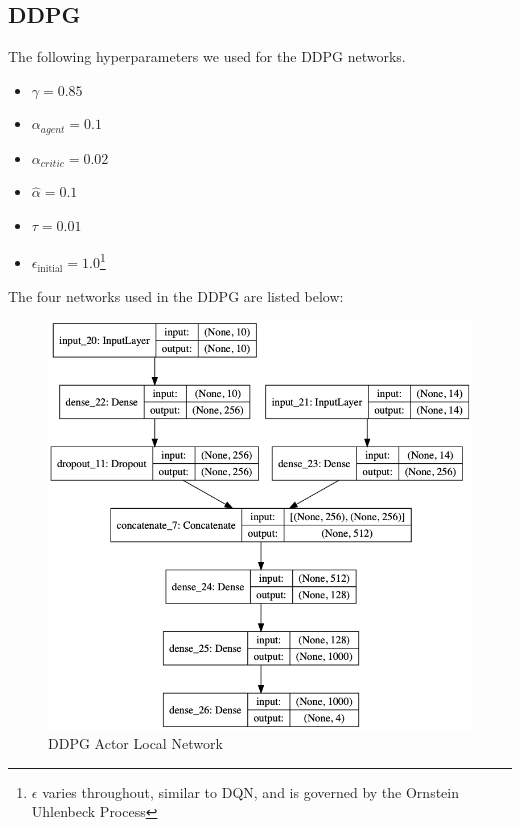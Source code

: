 \documentclass[doc, onecolumn, 12pt]{apa6}
\begin{document}
\subsection{DDPG}

The following hyperparameters we used for the DDPG networks. \begin{itemize}
\item $\gamma = 0.85$
\item $\alpha_{agent} = 0.1$
\item $\alpha_{critic} = 0.02$
\item $\hat{\alpha} = 0.1$ 
\item $\tau = 0.01$
\item $\epsilon_{\text{initial}} = 1.0$\footnote{$\epsilon$ varies throughout, similar to DQN, and is governed by the Ornstein Uhlenbeck Process} 
\end{itemize}

The four networks used in the DDPG are listed below: 

\begin{figure}
\label{DDPG_ActorLocal}
\includegraphics[width=\textwidth]{results/ddpg/DDPG_Actorlc.png}
\caption{DDPG Actor Local Network}
\end{figure}
\end{document}
